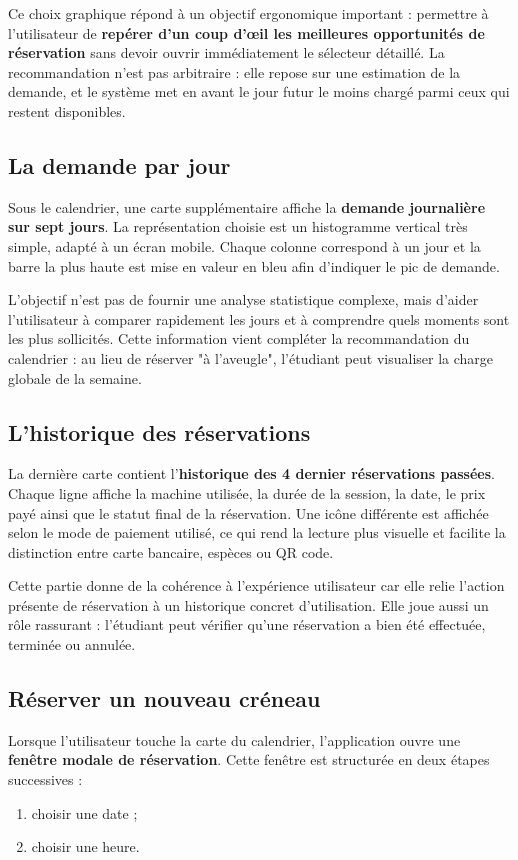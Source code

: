 \documentclass[12pt,a4paper]{article}
\begin{document}
Ce choix graphique répond à un objectif ergonomique important : permettre à l'utilisateur de \textbf{repérer d'un coup d'œil les meilleures opportunités de réservation} sans devoir ouvrir immédiatement le sélecteur détaillé. La recommandation n'est pas arbitraire : elle repose sur une estimation de la demande, et le système met en avant le jour futur le moins chargé parmi ceux qui restent disponibles.

\subsection*{La demande par jour}
Sous le calendrier, une carte supplémentaire affiche la \textbf{demande journalière sur sept jours}. La représentation choisie est un histogramme vertical très simple, adapté à un écran mobile. Chaque colonne correspond à un jour et la barre la plus haute est mise en valeur en bleu afin d'indiquer le pic de demande.

L'objectif n'est pas de fournir une analyse statistique complexe, mais d'aider l'utilisateur à comparer rapidement les jours et à comprendre quels moments sont les plus sollicités. Cette information vient compléter la recommandation du calendrier : au lieu de réserver "à l'aveugle", l'étudiant peut visualiser la charge globale de la semaine.

\subsection*{L'historique des réservations}
La dernière carte contient l'\textbf{historique des 4 dernier réservations  passées}. Chaque ligne affiche la machine utilisée, la durée de la session, la date, le prix payé ainsi que le statut final de la réservation. Une icône différente est affichée selon le mode de paiement utilisé, ce qui rend la lecture plus visuelle et facilite la distinction entre carte bancaire, espèces ou QR code.

Cette partie donne de la cohérence à l'expérience utilisateur car elle relie l'action présente de réservation à un historique concret d'utilisation. Elle joue aussi un rôle rassurant : l'étudiant peut vérifier qu'une réservation a bien été effectuée, terminée ou annulée.

\subsection*{Réserver un nouveau créneau}
Lorsque l'utilisateur touche la carte du calendrier, l'application ouvre une \textbf{fenêtre modale de réservation}. Cette fenêtre est structurée en deux étapes successives :
\begin{enumerate}
    \item choisir une date ;
    \item choisir une heure.
\end{enumerate}
\end{document}

